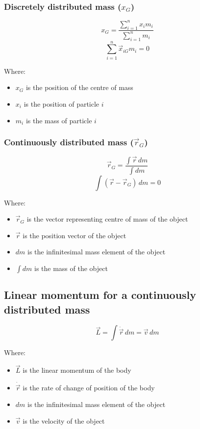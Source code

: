 \documentclass[11pt]{article}
\begin{document}
\subsubsection{Discretely distributed mass (\(x_G\))}
\label{sec:orgbc6677f}
\[x_G = \frac{\sum_{i = 1}^n x_i m_i}{\sum_{i = 1}^n m_i}\]
\[\sum_{i = 1}^n \vec{x}_{iG} m_i = 0\]

Where:
\begin{itemize}
\item \(x_G\) is the position of the centre of mass
\item \(x_i\) is the position of particle \(i\)
\item \(m_i\) is the mass of particle \(i\)
\end{itemize}

\subsubsection{Continuously distributed mass (\(\vec{r}_G\))}
\label{sec:orgc38a55e}
\[\vec{r}_G = \frac{\int \vec{r} \, dm}{\int dm}\]
\[\int (\vec{r} - \vec{r}_G) \, dm = 0\]

Where:
\begin{itemize}
\item \(\vec{r}_G\) is the vector representing centre of mass of the object
\item \(\vec{r}\) is the position vector of the object
\item \(dm\) is the infinitesimal mass element of the object
\item \(\int dm\) is the mass of the object
\end{itemize}

\subsection{Linear momentum for a continuously distributed mass}
\label{sec:orgb16af0e}
\[\vec{L} = \int \dot{\vec{r}} \, dm = \vec{v} \, dm\]

Where:
\begin{itemize}
\item \(\vec{L}\) is the linear momentum of the body
\item \(\dot{\vec{r}}\) is the rate of change of position of the body
\item \(dm\) is the infinitesimal mass element of the object
\item \(\vec{v}\) is the velocity of the object
\end{itemize}
\end{document}
